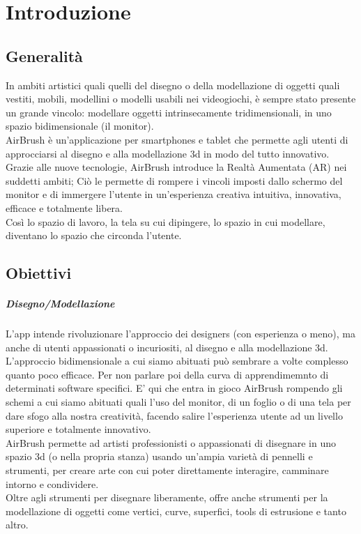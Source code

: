 \documentclass[11pt,fleqn]{book} %
\begin{document}
\pagestyle{fancy} %



\chapter{Introduzione}

\section{Generalità}
In ambiti artistici quali quelli del disegno o della modellazione di oggetti quali vestiti, mobili, modellini o modelli usabili nei videogiochi, è sempre stato presente un grande vincolo: modellare oggetti intrinsecamente tridimensionali, in uno spazio bidimensionale (il monitor).\\
AirBrush è un'applicazione per smartphones e tablet che permette agli utenti di approcciarsi al disegno e alla modellazione 3d in modo del tutto innovativo. \\
Grazie alle nuove tecnologie, AirBrush introduce la Realtà Aumentata (AR) nei suddetti ambiti; Ciò le permette di rompere i vincoli imposti dallo schermo del monitor e di immergere l'utente in un'esperienza creativa intuitiva, innovativa, efficace e totalmente libera.\\
Così lo spazio di lavoro, la tela su cui dipingere, lo spazio in cui modellare, diventano lo spazio che circonda l'utente.

\section{Obiettivi}
\paragraph{Disegno/Modellazione} L'app intende rivoluzionare l'approccio dei designers (con esperienza o meno), ma anche di utenti appassionati o incuriositi, al disegno e alla modellazione 3d. \\
L'approccio bidimensionale a cui siamo abituati può sembrare a volte complesso quanto poco efficace. Per non parlare poi della curva di apprendimemnto di determinati software specifici. E' qui che entra in gioco AirBrush rompendo gli schemi a cui siamo abituati quali l'uso del monitor, di un foglio o di una tela per dare sfogo alla nostra creatività, facendo salire l'esperienza utente ad un livello superiore e totalmente innovativo.\\
AirBrush permette ad artisti professionisti o appassionati di disegnare in uno spazio 3d (o nella propria stanza) usando un'ampia varietà di pennelli e strumenti, per creare arte con cui poter direttamente interagire, camminare intorno e condividere.\\
Oltre agli strumenti per disegnare liberamente, offre anche strumenti per la modellazione di oggetti come vertici, curve, superfici, tools di estrusione e tanto altro.
\end{document}
